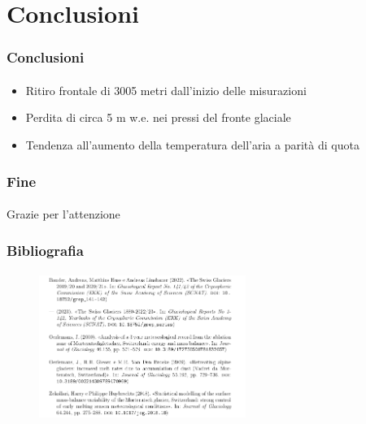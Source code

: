 \section{Conclusioni}

\begin{frame}

    \frametitle{Conclusioni}
    \framesubtitle{}
  
  \begin{itemize}[itemsep=1.5em, label=$\bullet$]
      \item Ritiro frontale di 3005 metri dall'inizio delle misurazioni
      \item Perdita di circa 5 m w.e. nei pressi del fronte glaciale
      \item Tendenza all'aumento della temperatura dell'aria a parità di quota
    \end{itemize}
  
  \end{frame}

\begin{frame}
    \frametitle{Fine}
    \framesubtitle{}

    \begin{center}
        Grazie per l'attenzione
    \end{center}
    
\end{frame}

\begin{frame}
    \frametitle{Bibliografia}
    \framesubtitle{}

    \begin{figure}
        \includegraphics[width=0.6\textwidth]{Immagini/bibliografia.png}
    \end{figure}
    
\end{frame}